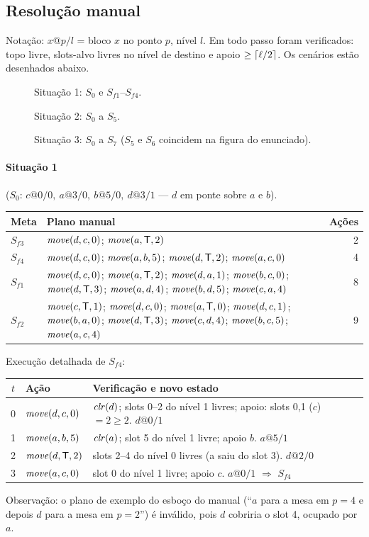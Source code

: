\documentclass[11pt,a4paper]{article}
\newcommand{\Tm}{\mathsf{T}}
\begin{document}
\subsection{Resolução manual}
Notação: $x@p/l$ = bloco $x$ no ponto $p$, nível $l$. Em todo passo foram verificados: topo livre, slots-alvo livres no nível de destino e apoio $\ge\lceil\ell/2\rceil$.
Os cenários estão desenhados abaixo.
\begin{figure}[h]\centering\caption{Situação 1: $S_0$ e $S_{f1}$--$S_{f4}$.}\end{figure}
\begin{figure}[h]\centering\caption{Situação 2: $S_0$ a $S_5$.}\end{figure}
\begin{figure}[h]\centering\caption{Situação 3: $S_0$ a $S_7$ ($S_5$ e $S_6$ coincidem na figura do enunciado).}\end{figure}

\paragraph{Situação 1} ($S_0$: $c@0/0,\ a@3/0,\ b@5/0,\ d@3/1$ --- $d$ em ponte sobre $a$ e $b$).
\begin{center}\footnotesize\begin{tabular}{@{}l@{\ }p{11.2cm}r@{}}\toprule
Meta & Plano manual & Ações\\\midrule
$S_{f3}$ & $\mathit{move}(d,c,0)$; $\mv(a,\Tm,2)$ & 2\\
$S_{f4}$ & $\mathit{move}(d,c,0)$; $\mathit{move}(a,b,5)$; $\mv(d,\Tm,2)$; $\mathit{move}(a,c,0)$ & 4\\
$S_{f1}$ & $\mathit{move}(d,c,0)$; $\mv(a,\Tm,2)$; $\mathit{move}(d,a,1)$; $\mathit{move}(b,c,0)$; $\mv(d,\Tm,3)$; $\mathit{move}(a,d,4)$; $\mathit{move}(b,d,5)$; $\mathit{move}(c,a,4)$ & 8\\
$S_{f2}$ & $\mv(c,\Tm,1)$; $\mathit{move}(d,c,0)$; $\mv(a,\Tm,0)$; $\mathit{move}(d,c,1)$; $\mathit{move}(b,a,0)$; $\mv(d,\Tm,3)$; $\mathit{move}(c,d,4)$; $\mathit{move}(b,c,5)$; $\mathit{move}(a,c,4)$ & 9\\\bottomrule
\end{tabular}\end{center}
Execução detalhada de $S_{f4}$:
\begin{center}\small\begin{tabular}{@{}clp{7.6cm}@{}}\toprule
$t$ & Ação & Verificação e novo estado\\\midrule
0 & $\mathit{move}(d,c,0)$ & $\mathit{clr}(d)$; slots 0--2 do nível 1 livres; apoio: slots 0,1 ($c$) $=2\ge2$. $d@0/1$\\
1 & $\mathit{move}(a,b,5)$ & $\mathit{clr}(a)$; slot 5 do nível 1 livre; apoio $b$. $a@5/1$\\
2 & $\mv(d,\Tm,2)$ & slots 2--4 do nível 0 livres (a saiu do slot 3). $d@2/0$\\
3 & $\mathit{move}(a,c,0)$ & slot 0 do nível 1 livre; apoio $c$. $a@0/1$ $\Rightarrow$ $S_{f4}$\\\bottomrule
\end{tabular}\end{center}
Observação: o plano de exemplo do esboço do manual (``$a$ para a mesa em $p=4$ e depois $d$ para a mesa em $p=2$'') é inválido, pois $d$ cobriria o slot 4, ocupado por $a$.
\end{document}
